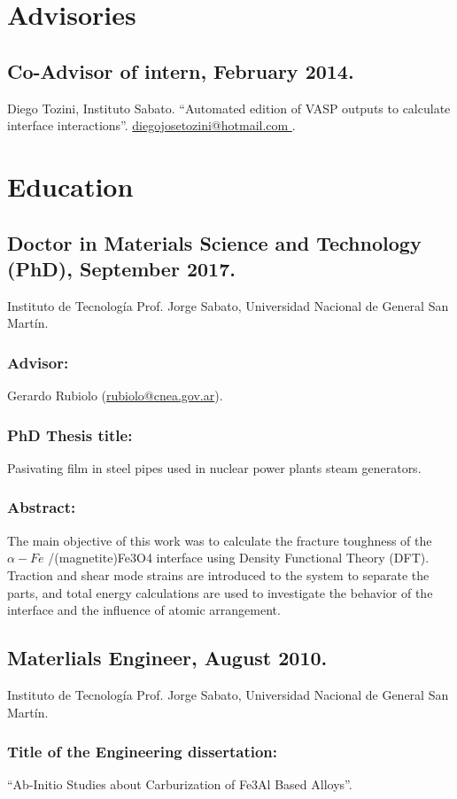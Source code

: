 \documentclass{my_cv}
\begin{document}
\section{Advisories}

\subsection{ Co-Advisor of intern, February 2014.} Diego Tozini, Instituto Sabato. “Automated edition
of VASP outputs to calculate interface interactions”. \url{diegojosetozini@hotmail.com
}.\section{Education}

\subsection{Doctor in Materials Science and Technology (PhD), September 2017.} Instituto de
Tecnología Prof. Jorge Sabato, Universidad Nacional de General San Martín. \subsubsection{Advisor:}
Gerardo Rubiolo (\url{rubiolo@cnea.gov.ar}).
\subsubsection{PhD Thesis title:} Pasivating film in steel pipes used in nuclear power plants steam
generators.
\subsubsection{Abstract:} The main objective of this work was to calculate the fracture toughness of the $\alpha-Fe$ /(magnetite)Fe3O4 interface using Density Functional Theory (DFT). Traction and
shear mode strains are introduced to the system to separate the parts, and total energy
calculations are used to investigate the behavior of the interface and the influence of
atomic arrangement.

\subsection{Materlials Engineer, August 2010.} Instituto de Tecnología Prof. Jorge Sabato,
Universidad Nacional de General San Martín.
\subsubsection{Title of the Engineering dissertation:} “Ab-Initio Studies about Carburization of Fe3Al Based Alloys”.
\end{document}

